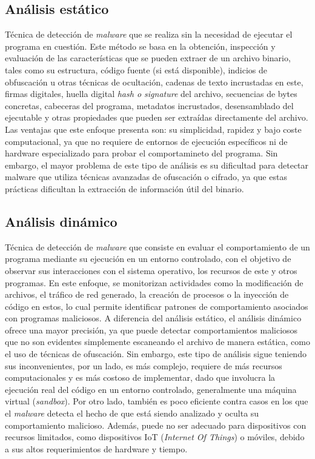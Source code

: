 \subsection{Análisis estático}

Técnica de detección de \textit{malware} que se realiza sin la necesidad de ejecutar el programa en cuestión. Este método se basa en la obtención, inspección y evaluación de las características que se pueden extraer de un archivo binario, tales como su estructura, código fuente (si está disponible), indicios de obfuscación u otras técnicas de ocultación, cadenas de texto incrustadas en este, firmas digitales, huella digital \textit{hash o signature} del archivo, secuencias de bytes concretas, cabeceras del programa, metadatos incrustados, desensamblado del ejecutable y otras propiedades que pueden ser extraídas directamente del archivo. Las ventajas que este enfoque presenta son: su simplicidad, rapidez y bajo coste computacional, ya que no requiere de entornos de ejecución específicos ni de hardware especializado para probar el comportamineto del programa. Sin embargo, el mayor problema de este tipo de análisis es su dificultad para detectar malware que utiliza técnicas avanzadas de ofuscación o cifrado, ya que estas prácticas dificultan la extracción de información útil del binario.

\subsection{Análisis dinámico}

Técnica de detección de \textit{malware} que consiste en evaluar el comportamiento de un programa mediante su ejecución en un entorno controlado, con el objetivo de observar sus interacciones con el sistema operativo, los recursos de este y otros programas. En este enfoque, se monitorizan actividades como la modificación de archivos, el tráfico de red generado, la creación de procesos o la inyección de código en estos, lo cual permite identificar patrones de comportamiento asociados con programas maliciosos. A diferencia del análisis estático, el análisis dinámico ofrece una mayor precisión, ya que puede detectar comportamientos maliciosos que no son evidentes simplemente escaneando el archivo de manera estática, como el uso de técnicas de ofuscación. Sin embargo, este tipo de análisis sigue teniendo sus inconvenientes, por un lado, es más complejo, requiere de más recursos computacionales y es más costoso de implementar, dado que involucra la ejecución real del código en un entorno controlado, generalmente una máquina virtual (\textit{sandbox}). Por otro lado, también es poco eficiente contra casos en los que el \textit{malware} detecta el hecho de que está siendo analizado y oculta su comportamiento malicioso. Además, puede no ser adecuado para dispositivos con recursos limitados, como dispositivos IoT (\textit{Internet Of Things}) o móviles, debido a sus altos requerimientos de hardware y tiempo.

